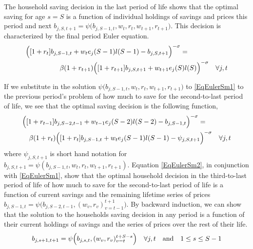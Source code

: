 \documentclass[letterpaper,12pt]{article}
\theoremstyle{definition}
\begin{document}
    \begin{spacing}{1.5}
    \vspace{10mm}

    \noindent The household saving decision in the last period of life shows that the optimal saving for age $s=S$ is a function of individual holdings of savings and prices this period and next $b_{j,S,t+1}=\psi\bigl(b_{j,S-1,t},w_t,r_t,w_{t+1},r_{t+1}\bigr)$. This decision is characterized by the final period Euler equation.
    \begin{equation}\label{EqEulerSm1}
      \begin{split}
        &\Bigl([1+r_t]b_{j,S-1,t} + w_t e_j(S-1)l(S-1) - b_{j,S,t+1}\Bigr)^{-\sigma} = \\
        &\quad\quad\quad\quad\quad \beta(1+r_{t+1})\Bigl([1+r_{t+1}]b_{j,S,t+1} + w_{t+1}e_j(S)l(S)\Bigr)^{-\sigma} \quad\forall j,t
      \end{split}
    \end{equation}

    If we substitute in the solution $\psi\bigl(b_{j,S-1,t},w_t,r_t,w_{t+1},r_{t+1}\bigr)$ to \eqref{EqEulerSm1} to the previous period's problem of how much to save for the second-to-last period of life, we see that the optimal saving decision is the following function,
    \begin{equation}\label{EqEulerSm2}
      \begin{split}
        &\Bigl([1+r_{t-1}]b_{j,S-2,t-1} + w_{t-1} e_j(S-2)l(S-2) - b_{j,S-1,t}\Bigr)^{-\sigma} = \\
        &\quad \beta(1+r_t)\Bigl([1+r_t]b_{j,S-1,t} + w_{t}e_j(S-1)l(S-1) - \psi_{j,S,t+1}\Bigr)^{-\sigma} \quad\forall j,t
      \end{split}
    \end{equation}
    where $\psi_{j,S,t+1}$ is short hand notation for $b_{j,S,t+1}=\psi(b_{j,S-1,t},w_t,r_t,w_{t+1},r_{t+1})$. Equation \eqref{EqEulerSm2}, in conjunction with \eqref{EqEulerSm1}, show that the optimal household decision in the third-to-last period of life of how much to save for the second-to-last period of life is a function of current savings and the remaining lifetime series of prices $b_{j,S-1,t}=\psi\bigl(b_{j,S-2,t-1},(w_v,r_v)_{v=t-1}^{t+1}\bigr)$. By backward induction, we can show that the solution to the households saving decision in any period is a function of their current holdings of savings and the series of prices over the rest of their life.
    \begin{equation}\label{EqPsiGen}
      b_{j,s+1,t+1} = \psi\Bigl(b_{j,s,t},(w_v,r_v)_{v=t}^{t+S-s}\Bigr) \quad\forall j,t \quad\text{and}\quad 1\leq s\leq S-1
    \end{equation}


\end{spacing}
\end{document}
